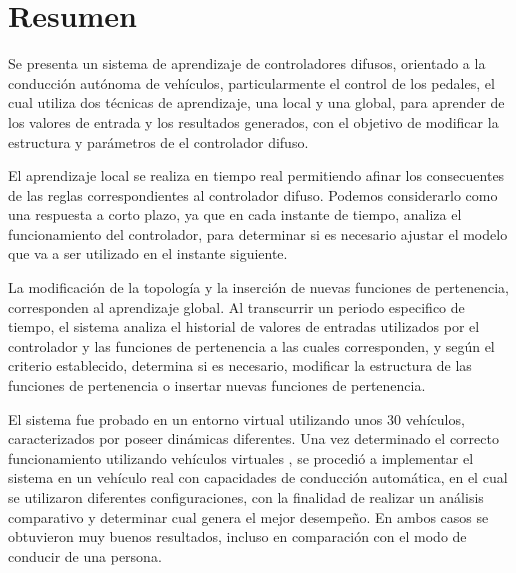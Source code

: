 \setcounter{page}{4}
\chapter*{Resumen}



Se presenta un sistema de aprendizaje de controladores difusos, orientado a la conducción autónoma de vehículos, particularmente el control de los pedales, el cual utiliza dos técnicas de aprendizaje, una local y una global, para aprender de los valores de entrada y los resultados generados, con el objetivo de modificar la estructura y parámetros de el controlador difuso.

El aprendizaje local se realiza en tiempo real permitiendo afinar los consecuentes de las reglas correspondientes al controlador difuso. Podemos considerarlo como una respuesta a corto plazo, ya que en cada instante de tiempo, analiza el funcionamiento del controlador, para determinar si es necesario ajustar el modelo que va a ser utilizado en el instante siguiente.

La modificación de la topología y la inserción de nuevas funciones de pertenencia, corresponden al aprendizaje global. Al transcurrir un periodo especifico de tiempo, el sistema analiza el historial de valores de entradas utilizados por el controlador y las funciones de pertenencia a las cuales corresponden, y según el criterio establecido, determina si es necesario, modificar la estructura de las funciones de pertenencia o insertar nuevas funciones de pertenencia.

El sistema fue probado en un entorno virtual utilizando unos 30 vehículos, caracterizados por poseer dinámicas diferentes. Una vez determinado el correcto funcionamiento utilizando vehículos virtuales , se procedió a implementar el sistema en un vehículo real con capacidades de conducción automática, en el cual se utilizaron diferentes configuraciones, con la finalidad de realizar un análisis comparativo y determinar cual genera el mejor desempeño. En ambos casos se obtuvieron muy buenos resultados, incluso en comparación con el modo de conducir de una persona.

\newpage

